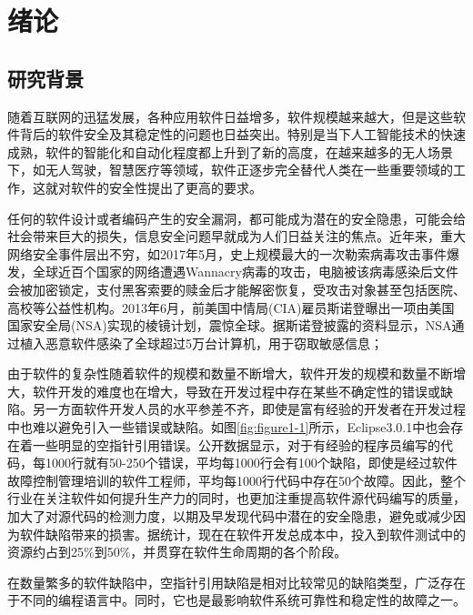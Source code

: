 \chapter{绪论}
\label{chap:intro}
\section{研究背景}

随着互联网的迅猛发展，各种应用软件日益增多，软件规模越来越大，但是这些软件背后的软件安全及其稳定性的问题也日益突出。特别是当下人工智能技术的快速成熟，软件的智能化和自动化程度都上升到了新的高度，在越来越多的无人场景下，如无人驾驶，智慧医疗等领域，软件正逐步完全替代人类在一些重要领域的工作，这就对软件的安全性\cite{chess2011software}提出了更高的要求。

任何的软件设计或者编码产生的安全漏洞\cite{shan2002}，都可能成为潜在的安全隐患，可能会给社会带来巨大的损失，信息安全问题早就成为人们日益关注的焦点\cite{vassilev2014importance}。近年来，重大网络安全事件层出不穷，如2017年5月，史上规模最大的一次勒索病毒攻击事件爆发，全球近百个国家的网络遭遇Wannacry病毒\cite{li2017wannacry}的攻击，电脑被该病毒感染后文件会被加密锁定，支付黑客索要的赎金后才能解密恢复，受攻击对象甚至包括医院、高校等公益性机构。2013年6月，前美国中情局(CIA)雇员斯诺登曝出一项由美国国家安全局(NSA)实现的棱镜计划\cite{zhang2014}，震惊全球。据斯诺登披露的资料显示，NSA通过植入恶意软件感染了全球超过5万台计算机，用于窃取敏感信息；

由于软件的复杂性随着软件的规模和数量不断增大，软件开发的规模和数量不断增大，软件开发的难度也在增大，导致在开发过程中存在某些不确定性的错误或缺陷。另一方面软件开发人员的水平参差不齐，即使是富有经验的开发者在开发过程中也难以避免引入一些错误或缺陷。如图\ref{fig:figure1-1}所示，Eclipse3.0.1中也会存在着一些明显的空指针引用错误\cite{hovemeyer2005evaluating}。公开数据显示，对于有经验的程序员编写的代码，每1000行就有50-250个错误，平均每1000行会有100个缺陷，即使是经过软件故障控制管理培训的软件工程师，平均每1000行代码中存在50个故障\cite{gong2008}。因此，整个行业在关注软件如何提升生产力的同时，也更加注重提高软件源代码编写的质量，加大了对源代码的检测力度，以期及早发现代码中潜在的安全隐患，避免或减少因为软件缺陷带来的损害。据统计，现在在软件开发总成本中，投入到软件测试中的资源约占到25\%到50\%\cite{gong2006}，并贯穿在软件生命周期的各个阶段。

在数量繁多的软件缺陷中，空指针引用缺陷是相对比较常见的缺陷类型，广泛存在于不同的编程语言中。同时，它也是最影响软件系统可靠性和稳定性的故障之一。

